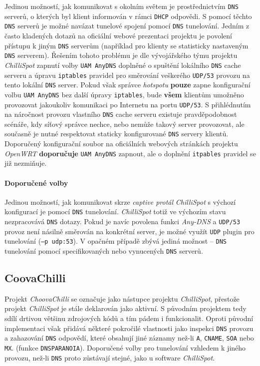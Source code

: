 \documentclass[thesis=M,czech]{FITthesis}[2012/10/20]
\begin{document}
Jedinou možností, jak komunikovat s okolním světem je prostřednictvím \texttt{DNS} serverů, o kterých byl klient informován v rámci \texttt{DHCP} odpovědi. S pomocí těchto \texttt{DNS} serverů je možné navázat tunelové spojení pomocí \texttt{DNS} tunelování. Jedním z často kladených dotazů na oficiální webové prezentaci projektu\cite{chillispot-faq} je povolení přístupu k jiným \texttt{DNS} serverům (například pro klienty se statisticky nastaveným \texttt{DNS} serverem). Řešením tohoto problému je dle vývojářského týmu projektu \textit{ChilliSpot} zapnutí volby \texttt{UAM AnyDNS} doplněné o spuštění lokálního \texttt{DNS} cache serveru a úpravu \texttt{iptables} pravidel pro směrování veškerého \texttt{UDP/53} provozu na tento lokální \texttt{DNS} server. Pokud však správce \textit{hotspotu} \textbf{pouze} zapne konfigurační volbu \texttt{UAM AnyDNS} bez další úpravy \texttt{iptables}, bude \textbf{všem} klientům umožněno provozovat jakoukoliv komunikaci po Internetu na portu \texttt{UDP/53}. S přihlédnutím na náročnost provozu vlastního \texttt{DNS} cache serveru existuje pravděpodobnost scénáře, kdy síťový správce nechce, nebo nemůže takový server provozovat, ale současně je nutné respektovat staticky konfigurované \texttt{DNS} servery klientů. Doporučený konfigurační soubor na oficiálních webových stránkách projektu \textit{OpenWRT} \textbf{doporučuje} \texttt{UAM AnyDNS} zapnout, ale o doplnění \texttt{itpables} pravidel se již nezmiňuje\cite{chillispot-openwrt}. 

\paragraph{Doporučené volby} Jedinou možností, jak komunikovat skrze \textit{captive protál} \textit{ChilliSpot} s výchozí konfigurací je pomocí \texttt{DNS} tunelování. \textit{ChilliSpot} totiž ve výchozím stavu nezpracovává \texttt{DNS} dotazy. Pokud je navíc povolena funkci \textit{Any-DNS} a \texttt{UDP/53} provoz není násilně směrován na konkrétní server, je možné využít \texttt{UDP} plugin pro tunelování (\texttt{--p udp:53}). V opačném případě zbývá jediná možnost -- \texttt{DNS} tunelování pomocí specifikovaných nebo vynucených \texttt{DNS} serverů.


\subsection{CoovaChilli}

Projekt \textit{ChoovaChilli} se označuje jako nástupce projektu \textit{ChilliSpot}, přestože projekt \textit{ChilliSpot} je stále deklarován jako aktivní. S původním projektem tedy sdílí drtivou většinu zdrojových kódů a tím pádem i funkcionalit. Oproti původní implementaci však přidává některé pokročilé vlastnosti jako inspekci \texttt{DNS} provozu a zahazování \texttt{DNS} odpovědí, které obsahují jiné záznamy než-li \texttt{A}, \texttt{CNAME}, \texttt{SOA} nebo \texttt{MX}. (funkce \texttt{DNSPARANOIA}). Doporučené volby pro tunelování vzhledem k  jiného provozu, než-li \texttt{DNS} proto zůstávají stejné, jako u software \textit{ChilliSpot}.
    
\end{document}
